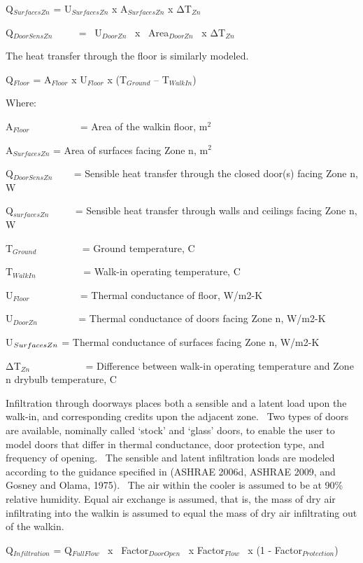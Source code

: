 Q\(_{SurfacesZn}\) = U\(_{SurfacesZn}\) x A\(_{SurfacesZn}\) x ΔT\(_{Zn}\)

Q\(_{DoorSensZn}\) ~~~~ = ~U\(_{DoorZn}\)~ x~ Area\(_{DoorZn}\) ~x ΔT\(_{Zn}\)

The heat transfer through the floor is similarly modeled.

Q\(_{Floor}\) = A\(_{Floor}\) x U\(_{Floor}\) x (T\(_{Ground}\) -- T\(_{WalkIn}\))

Where:

A\(_{Floor}\) ~~~~~~~~~ = Area of the walkin floor, m\(^{2}\)

A\(_{SurfacesZn}\) = Area of surfaces facing Zone n, m\(^{2}\)

Q\(_{DoorSensZn}\) ~~~ = Sensible heat transfer through the closed door(s) facing Zone n, W

Q\(_{surfacesZn}\) ~~~~ = Sensible heat transfer through walls and ceilings facing Zone n, W

T\(_{Ground}\) ~~~~~~~~ = Ground temperature, C

T\(_{WalkIn}\)~~~~~~~~~ = Walk-in operating temperature, C

U\(_{Floor}\) ~~~~~~~~~ = Thermal conductance of floor, W/m2-K

U\(_{DoorZn}\) ~~~~~~~ = Thermal conductance of doors facing Zone n, W/m2-K

U\(_{SurfacesZn\\}\) = Thermal conductance of surfaces facing Zone n, W/m2-K

ΔT\(_{Zn}\) ~~~~~~~~~~ = Difference between walk-in operating temperature and Zone n drybulb temperature, C

Infiltration through doorways places both a sensible and a latent load upon the walk-in, and corresponding credits upon the adjacent zone.~ Two types of doors are available, nominally called `stock' and `glass' doors, to enable the user to model doors that differ in thermal conductance, door protection type, and frequency of opening.~ The sensible and latent infiltration loads are modeled according to the guidance specified in (ASHRAE 2006d, ASHRAE 2009, and Gosney and Olama, 1975).~ The air within the cooler is assumed to be at 90\% relative humidity. Equal air exchange is assumed, that is, the mass of dry air infiltrating into the walkin is assumed to equal the mass of dry air infiltrating out of the walkin.

Q\(_{Infiltration}\) = Q\(_{FullFlow}\) ~x~ Factor\(_{DoorOpen}\) ~x Factor\(_{Flow}\) ~x (1 - Factor\(_{Protection}\))

